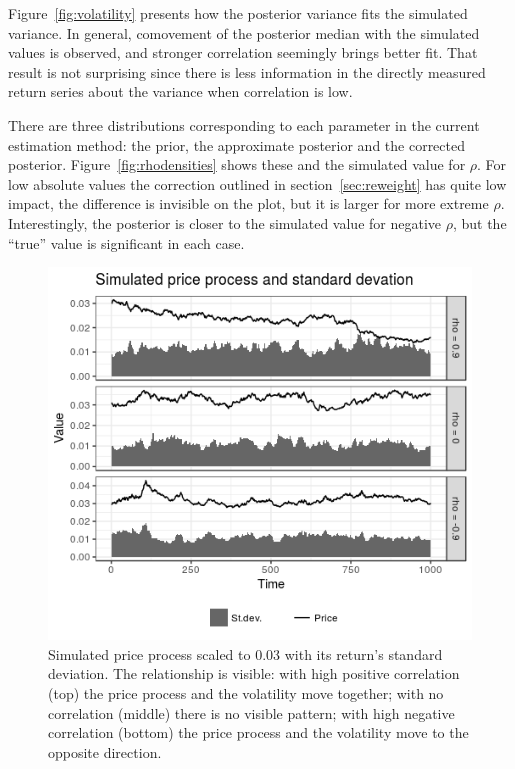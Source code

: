 Figure~\ref{fig:volatility} presents how the posterior variance fits the simulated variance.
In general, comovement of the posterior median with the simulated values is observed, and stronger correlation seemingly brings better fit.
That result is not surprising since there is less information in the directly measured return series about the variance when correlation is low.

There are three distributions corresponding to each parameter in the current estimation method: the prior, the approximate posterior and the corrected posterior.
Figure~\ref{fig:rhodensities} shows these and the simulated value for $\rho$.
For low absolute values the correction outlined in section~\ref{sec:reweight} has quite low impact, the difference is invisible on the plot, but it is larger for more extreme $\rho$.
Interestingly, the posterior is closer to the simulated value for negative $\rho$, but the ``true'' value is significant in each case.

\begin{figure}
	\centering
	\includegraphics[width=\linewidth]{simulations/data-plot}
	\caption{Simulated price process scaled to 0.03 with its return's standard deviation. The relationship is visible: with high positive correlation (top) the price process and the volatility move together; with no correlation (middle) there is no visible pattern; with high negative correlation (bottom) the price process and the volatility move to the opposite direction.}
	\label{fig:simdata}
\end{figure}

